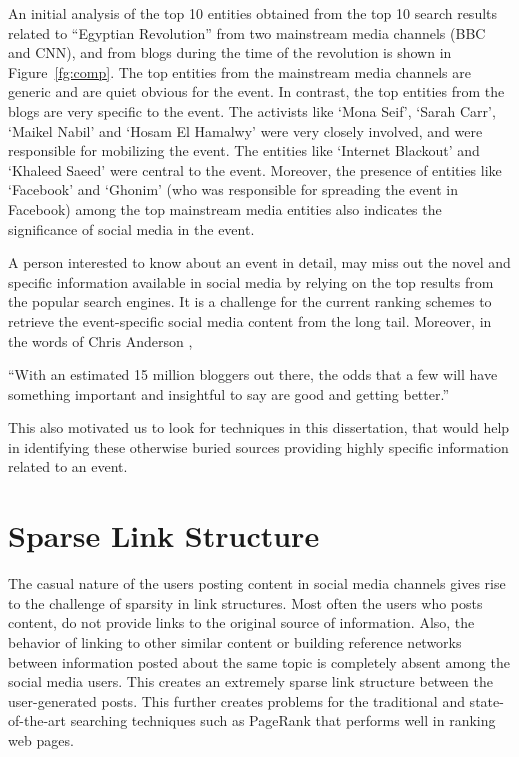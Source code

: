 An initial analysis of the top 10 entities obtained from the top 10 search results related to ``Egyptian Revolution'' from two mainstream media channels (BBC and CNN), and from blogs during the time of the revolution is shown in Figure~\ref{fg:comp}. The top entities from the mainstream media channels are generic and are quiet obvious for the event. In contrast, the top entities from the blogs are very specific to the event. The activists like `Mona Seif', `Sarah Carr', `Maikel Nabil' and `Hosam El Hamalwy' were very closely involved, and were responsible for mobilizing the event. The entities like `Internet Blackout' and `Khaleed Saeed' were central to the event. Moreover, the presence of entities like `Facebook' and `Ghonim' (who was responsible for spreading the event in Facebook) among the top mainstream media entities also indicates the significance of social media in the event.

A person interested to know about an event in detail, may miss out the novel and specific information available in social media by relying on the top results from the popular search engines. It is a challenge for the current ranking schemes to retrieve the event-specific social media content from the long tail. Moreover, in the words of Chris Anderson \cite{anderson2008long}, \begin{itshape} \small ``With an estimated 15 million bloggers out there, the odds that a few will have something important and insightful to say are good and getting better.'' \end{itshape} This also motivated us to look for techniques in this dissertation, that would help in identifying these otherwise buried sources providing highly specific information related to an event.

\section{Sparse Link Structure}
The casual nature of the users posting content in social media channels gives rise to the challenge of sparsity in link structures. Most often the users who posts content, do not provide links to the original source of information. Also, the behavior of linking to other similar content or building reference networks between information posted about the same topic is completely absent among the social media users. This creates an extremely sparse link structure between the user-generated posts. This further creates problems for the traditional and state-of-the-art searching techniques such as PageRank \cite{brin1998anatomy} that performs well in ranking web pages.

